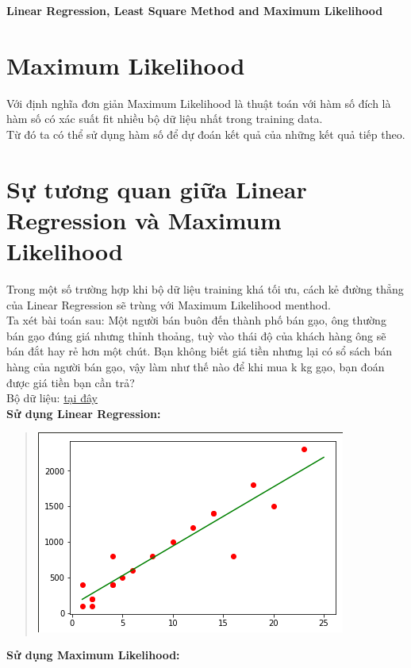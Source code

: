 \documentclass[12pt,letterpaper]{article}
\begin{document}
\begin{center}
    \Large \textbf{Linear Regression, Least Square Method and Maximum Likelihood}
\end{center}

\section*{Maximum Likelihood}
Với định nghĩa đơn giản Maximum Likelihood là thuật toán với hàm số đích là hàm số có xác suất fit nhiều bộ dữ liệu nhất trong training data.
\\
Từ đó ta có thể sử dụng hàm số để dự đoán kết quả của những kết quả tiếp theo.

\section*{Sự tương quan giữa Linear Regression và Maximum \\Likelihood }
Trong một số trường hợp khi bộ dữ liệu training khá tối ưu, cách kẻ đường thẳng của Linear Regression sẽ trùng với Maximum Likelihood menthod.
\\
Ta xét bài toán sau: Một người bán buôn đến thành phố bán gạo, ông thường bán gạo đúng giá nhưng thỉnh thoảng, tuỳ vào thái độ của khách hàng ông sẽ bán đắt hay rẻ hơn một chút. Bạn không biết giá tiền nhưng lại có sổ sách bán hàng của người bán gạo, vậy làm như thế nào để khi mua k kg gạo, bạn đoán được giá tiền bạn cần trả?
\\
Bộ dữ liệu: \href{https://github.com/LittleCuteBug/LinearReagression/blob/master/RicePrice.csv}{tại đây}
\\
\textbf{Sử dụng Linear Regression:}
\begin{quote}
\centering\includegraphics[scale=1]{LinearRegression.png}
\end{quote}
\textbf{Sử dụng Maximum Likelihood:}
\\
\end{document}
